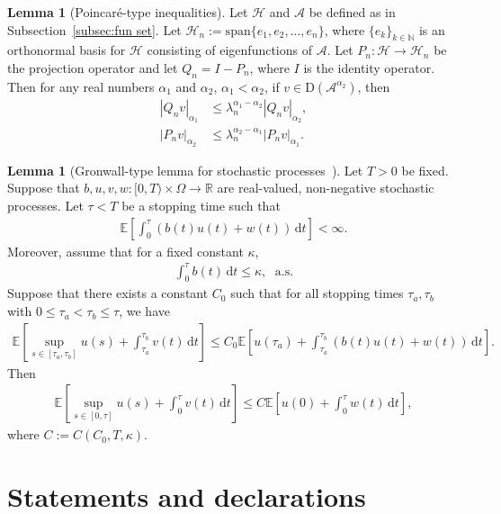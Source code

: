 \documentclass[11pt, reqno]{amsart}
\theoremstyle{definition}
\newtheorem{lemma}[theorem]{Lemma}
\numberwithin{equation}{section}
\newcommand{\bb}{\mathbb}
\newcommand{\dt}{\mathrm{d}t}
\newcommand{\abs}[1]{\left|{#1}\right|}
\begin{document}
\begin{lemma}[Poincar\'e-type inequalities]\label{lem:poincare}
	Let $\mathcal{H}$ and $\mathcal{A}$ be defined as in Subsection~\ref{subsec:fun set}. Let $\mathcal{H}_n:= \text{span}\{e_1,e_2,\ldots,e_n\}$, where $\{e_k\}_{k\in \bb{N}}$ is an orthonormal basis for $\mathcal{H}$ consisting of eigenfunctions of $\mathcal{A}$. Let $P_n:\mathcal{H}\to \mathcal{H}_n$ be the projection operator and let $Q_n=I-P_n$, where $I$ is the identity operator. Then for any real numbers $\alpha_1$ and $\alpha_2$, $\alpha_1<\alpha_2$, if $v\in \mathrm{D}(\mathcal{A}^{\alpha_2})$, then
	\begin{align}\label{equ:poincare Qn}
		\abs{Q_n v}_{\alpha_1} &\leq \lambda_n^{\alpha_1-\alpha_2} \abs{Q_n v}_{\alpha_2},
		\\
		\label{equ:Poincare Pn}
		\abs{P_n v}_{\alpha_2} &\leq \lambda_n^{\alpha_2-\alpha_1} \abs{P_n v}_{\alpha_1}.
	\end{align}
\end{lemma}

\begin{lemma}[Gronwall-type lemma for stochastic processes~\cite{GlaZia09}]\label{lem:gronwall}
Let $T>0$ be fixed. Suppose that $b,u,v,w: [0,T)\times \Omega\to\bb{R}$ are real-valued, non-negative stochastic processes. Let $\tau<T$ be a stopping time such that
\begin{align*}
	\bb{E}\left[ \int_0^\tau (b(t)u(t)+w(t))\, \dt \right] <\infty.
\end{align*}
Moreover, assume that for a fixed constant $\kappa$,
\begin{align*}
	\int_0^\tau b(t)\,\dt \leq \kappa, \; \text{ a.s.}
\end{align*}
Suppose that there exists a constant $C_0$ such that for all stopping times $\tau_a,\tau_b$ with $0\leq \tau_a < \tau_b \leq \tau$, we have
\begin{align*}
	\bb{E}\left[ \sup_{s\in [\tau_a,\tau_b]} u(s) + \int_{\tau_a}^{\tau_b} v(t)\,\dt\right] \leq C_0 \bb{E}\left[ u(\tau_a)+ \int_{\tau_a}^{\tau_b} (b(t)u(t)+w(t))\, \dt \right].
\end{align*}
Then
\begin{align*}
	\bb{E}\left[ \sup_{s\in [0,\tau]} u(s) + \int_0^\tau v(t)\,\dt\right] 
	\leq C\bb{E}\left[ u(0)+ \int_0^\tau w(t)\,\dt \right],
\end{align*}
where $C:= C(C_0,T,\kappa)$.
\end{lemma}


\section*{Statements and declarations}
\end{document}
